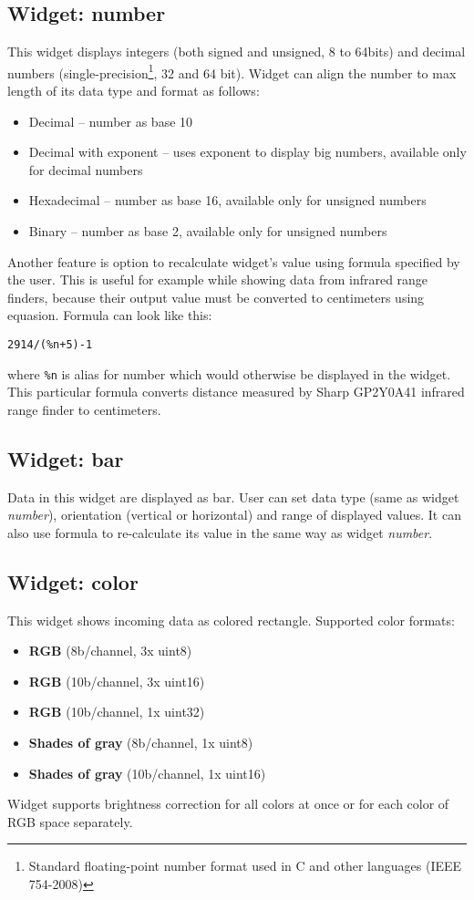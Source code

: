 \documentclass[12pt, a4paper, oneside]{article}
\newcommand{\It}{\textit}  %
\begin{document}
\subsection{Widget: number}
This widget displays integers (both signed and unsigned, 8 to 64bits) and decimal numbers (single-precision\footnote{Standard floating-point number format used in C and other languages (IEEE 754-2008)}, 32 and 64 bit).
Widget can align the number to max length of its data type and format as follows:
\begin{itemize}
    \item Decimal -- number as base 10
    \item Decimal with exponent -- uses exponent to display big numbers, available only for decimal numbers
    \item Hexadecimal -- number as base 16, available only for unsigned numbers
    \item Binary -- number as base 2, available only for unsigned numbers
\end{itemize}

Another feature is option to recalculate widget's value using formula specified by the user. This is useful for example while showing data from infrared range finders, because their output value must be converted to centimeters using equasion. Formula can look like this:
\begin{center}
\verb|2914/(%n+5)-1|
\end{center}
where \verb|%n| is alias for number which would otherwise be displayed in the widget. This particular formula converts distance measured by Sharp GP2Y0A41 infrared range finder to centimeters.

\subsection{Widget: bar}
Data in this widget are displayed as bar. User can set data type (same as widget \It{number}), orientation (vertical or horizontal) and range of displayed values. It can also use formula to re-calculate its value in the same way as widget \It{number}.

\subsection{Widget: color}
This widget shows incoming data as colored rectangle. Supported color formats:
\begin{itemize}
    \item {\bf RGB} (8b/channel, 3x uint8)
    \item {\bf RGB} (10b/channel, 3x uint16)
    \item {\bf RGB} (10b/channel, 1x uint32)
    \item {\bf Shades of gray} (8b/channel, 1x uint8)
    \item {\bf Shades of gray} (10b/channel, 1x uint16)
\end{itemize}
Widget supports brightness correction for all colors at once or for each color of RGB space separately.
\end{document}
